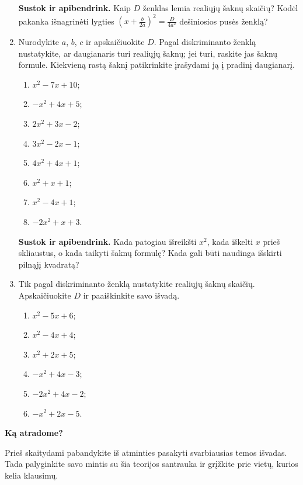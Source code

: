 \documentclass[12pt,a4paper]{article}
\begin{document}
\begin{enumerate}
\begin{enumerate}
\end{enumerate}
\par\medskip
\textbf{Sustok ir apibendrink.} Kaip $D$ ženklas lemia realiųjų šaknų skaičių? Kodėl pakanka išnagrinėti lygties $\left(x+\frac{b}{2a}\right)^2=\frac{D}{4a^2}$ dešiniosios pusės ženklą?
\item Nurodykite $a$, $b$, $c$ ir apskaičiuokite $D$. Pagal diskriminanto ženklą nustatykite, ar daugianaris turi realiųjų šaknų; jei turi, raskite jas šaknų formule. Kiekvieną rastą šaknį patikrinkite įrašydami ją į pradinį daugianarį.
\begin{multicols}{2}\begin{enumerate}
\item $x^2-7x+10$; \item $-x^2+4x+5$; \item $2x^2+3x-2$; \item $3x^2-2x-1$;
\item $4x^2+4x+1$; \item $x^2+x+1$; \item $x^2-4x+1$; \item $-2x^2+x+3$.
\end{enumerate}\end{multicols}
\par\medskip
\textbf{Sustok ir apibendrink.} Kada patogiau išreikšti $x^2$, kada iškelti $x$ prieš skliaustus, o kada taikyti šaknų formulę? Kada gali būti naudinga išskirti pilnąjį kvadratą?
\item Tik pagal diskriminanto ženklą nustatykite realiųjų šaknų skaičių. Apskaičiuokite $D$ ir paaiškinkite savo išvadą.
\begin{multicols}{2}\begin{enumerate}
\item $x^2-5x+6$; \item $x^2-4x+4$; \item $x^2+2x+5$; \item $-x^2+4x-3$; \item $-2x^2+4x-2$; \item $-x^2+2x-5$.
\end{enumerate}\end{multicols}
\end{enumerate}
\newpage
\begin{center}{\Large\bfseries Ką atradome?}\end{center}
Prieš skaitydami pabandykite iš atminties pasakyti svarbiausias temos išvadas. Tada palyginkite savo mintis su šia teorijos santrauka ir grįžkite prie vietų, kurios kelia klausimų.
\end{document}
